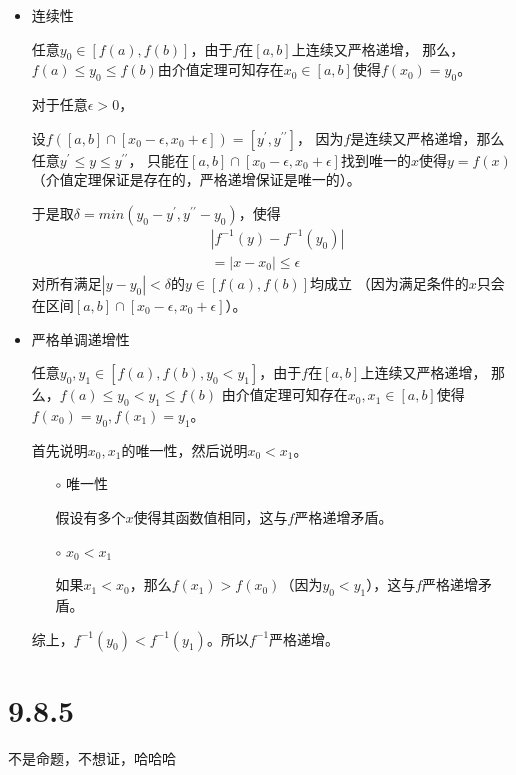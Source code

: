 \documentclass{article}
\begin{document}
\begin{itemize}
  \item 连续性

        任意$y_0 \in [f(a), f(b)]$，由于$f$在$[a, b]$上连续又严格递增，
        那么，$f(a) \leq y_0 \leq f(b)$由介值定理可知存在$x_0 \in [a, b]$使得$f(x_0) = y_0$。

        对于任意$\epsilon > 0$，

        设$f([a, b] \cap [x_0 - \epsilon, x_0 + \epsilon]) = [y^\prime, y^{\prime\prime}]$，
        因为$f$是连续又严格递增，那么任意$y^\prime \leq y \leq y^{\prime\prime}$，
        只能在$[a, b] \cap [x_0 - \epsilon, x_0 + \epsilon]$找到唯一的$x$使得$y = f(x)$
        （介值定理保证是存在的，严格递增保证是唯一的）。

        于是取$\delta = min(y_0 - y^\prime, y^{\prime\prime} - y_0)$，使得
        \begin{align*}
           & |f^{-1}(y) - f^{-1}(y_0)| \\
           & = |x - x_0| \leq \epsilon
        \end{align*}
        对所有满足$|y - y_0| < \delta$的$y \in [f(a),f(b)]$均成立
        （因为满足条件的$x$只会在区间$[a, b] \cap [x_0 - \epsilon, x_0 + \epsilon]$）。

  \item 严格单调递增性

        任意$y_0, y_1 \in [f(a), f(b), y_0 < y_1]$，由于$f$在$[a, b]$上连续又严格递增，
        那么，$f(a) \leq y_0 < y_1 \leq f(b)$
        由介值定理可知存在$x_0,x_1 \in [a, b]$使得$f(x_0) = y_0, f(x_1) = y_1$。

        首先说明$x_0, x_1$的唯一性，然后说明$x_0 < x_1$。

        \begin{itemize}
          \item[$\circ$] 唯一性

                假设有多个$x$使得其函数值相同，这与$f$严格递增矛盾。
          \item[$\circ$] $x_0 < x_1$

              如果$x_1 < x_0$，那么$f(x_1) > f(x_0)$（因为$y_0 < y_1$），这与$f$严格递增矛盾。
        \end{itemize}

        综上，$f^{-1}(y_0) < f^{-1}(y_1)$。所以$f^{-1}$严格递增。
\end{itemize}

\section*{9.8.5}

不是命题，不想证，哈哈哈
\end{document}
